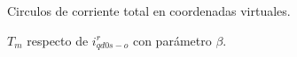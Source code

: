 \documentclass[a4paper, 10pt, onecolumn,journal]{ieeeconf}
\begin{document}
\begin{figure}[H]
    \centering
    \begin{adjustbox}{scale = 0.6}
    \end{adjustbox}
    \caption{Circulos de corriente total en coordenadas virtuales.}
    \label{restriccion de corriente maxima}
\end{figure}

\begin{figure}[H]
    \centering
    \begin{adjustbox}{scale = 0.6}
    \end{adjustbox}
    \caption{$T_m$ respecto de $i^r_{qd0s-o}$ con parámetro $\beta$.}
    \label{T_m respecto a i_qd0s-o}
\end{figure}
\end{document}
